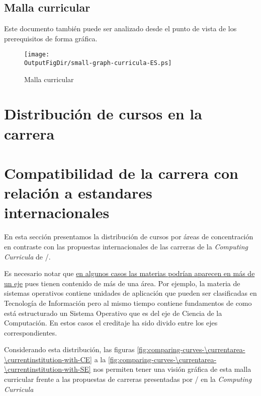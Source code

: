 \begin{landscape}



\section{Malla curricular}\label{sec:vision-grafica}
\vspace{-0.3cm}
Este documento también puede ser analizado desde el punto de vista 
de los prerequisitos de forma gráfica.

\begin{figure}[H]
      \texttt{[image: \\OutputFigDir/small-graph-curricula-ES.ps]}
      \label{fig:malla-curricular}
      \caption{Malla curricular \SchoolFullName}
\end{figure}
\end{landscape}



\section{Distribución de cursos en la carrera}

\section{Compatibilidad de la carrera con relación a estandares internacionales}
En esta sección presentamos la distribución de cursos por áreas de concentración en 
contraste con las propuestas internacionales de las carreras de la \textit{Computing Curricula} 
de /.

Es necesario notar que \underline{en algunos casos las materias podrí­an aparecen en más de un eje} 
pues tienen contenido de más de una área. 
Por ejemplo, la materia de sistemas operativos contiene unidades de aplicación 
que pueden ser clasificadas en Tecnologí­a de Información pero al mismo tiempo contiene fundamentos 
de como está estructurado un Sistema Operativo que es del eje de Ciencia de la Computación. 
En estos casos el creditaje ha sido divido entre los ejes correspondientes.


Considerando esta distribución, las figuras \ref{fig:comparing-curves-\currentarea-\currentinstitution-with-CE} 
a la \ref{fig:comparing-curves-\currentarea-\currentinstitution-with-SE} 
nos permiten tener una visión gráfica de esta malla curricular frente a las propuestas de 
carreras presentadas por / en la \textit{Computing Curricula}

